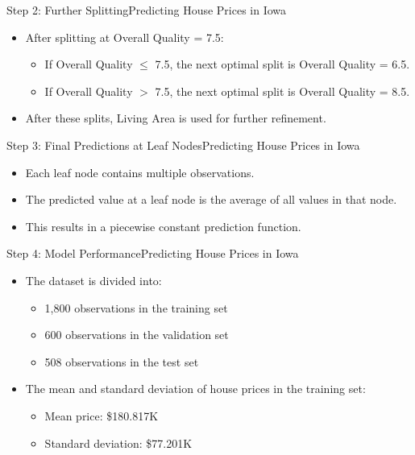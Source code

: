 \documentclass[11pt]{beamer}
\begin{document}
%
%
\begin{frame}{Step 2: Further Splitting}{Predicting House Prices in Iowa}
    \begin{itemize}
        \item After splitting at Overall Quality = 7.5:
        \begin{itemize}
            \item If Overall Quality $\le$ 7.5, the next optimal split is Overall Quality = 6.5.
            \item If Overall Quality $>$ 7.5, the next optimal split is Overall Quality = 8.5.
        \end{itemize}
        \item After these splits, Living Area is used for further refinement.
    \end{itemize}
\end{frame}
%
%
\begin{frame}{Step 3: Final Predictions at Leaf Nodes}{Predicting House Prices in Iowa}
    \begin{itemize}
        \item Each leaf node contains multiple observations.
        \item The predicted value at a leaf node is the average of all values in that node.
        \item This results in a piecewise constant prediction function.
    \end{itemize}
\end{frame}
%
%
\begin{frame}{Step 4: Model Performance}{Predicting House Prices in Iowa}
    \begin{itemize}
        \item The dataset is divided into:
        \begin{itemize}
            \item 1,800 observations in the training set
            \item 600 observations in the validation set
            \item 508 observations in the test set
        \end{itemize}
        \item The mean and standard deviation of house prices in the training set:
        \begin{itemize}
            \item Mean price: \$180.817K
            \item Standard deviation: \$77.201K
        \end{itemize}
    \end{itemize}
\end{frame}
\end{document}
